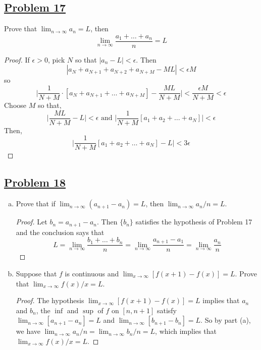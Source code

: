 \documentclass[10pt,letterpaper]{article}
\begin{document}
	\subsection*{{\color{purple}\underline{Problem 17}}}
	Prove that $\displaystyle\lim_{n\to \infty}a_n = L$, then
	$$\displaystyle\lim_{n\to \infty} \dfrac{a_1 + \ldots + a_n}{n} = L$$
	\begin{proof}
		If $\epsilon > 0$, pick $N$ so that $|a_n - L| < \epsilon$. Then 
		$$|a_N + a_{N+1} + a_{N + 2} + a_{N + M} - ML| < \epsilon M$$
		so 
		$$\bigg|\dfrac{1}{N + M} \cdot [a_N + a_{N+1} + \ldots + a_{N+M}]  - \dfrac{ML}{N + M}\bigg| < \dfrac{\epsilon M}{N + M} < \epsilon$$
		Choose $M$ so that,
		$$\bigg|\dfrac{ML}{N + M} - L\bigg| < \epsilon \text{ and } \bigg| \dfrac{1}{N + M}[a_1 + a_2 + \ldots + a_N]\bigg| < \epsilon$$
		Then,
		$$\bigg| \dfrac{1}{N + M}[a_1 + a_2 + \ldots + a_N] - L\bigg| < 3 \epsilon$$
	\end{proof}
	
	\subsection*{{\color{purple}\underline{Problem 18}}}
	\begin{enumerate}[(a)]
		\item Prove that if $\displaystyle\lim_{n\to \infty}(a_{n+1} - a_n) = L$, then $\displaystyle\lim_{n\to \infty}a_n/n = L$. 
		\begin{proof}
		Let $b_n = a_{n+1} - a_n$. Then $\{b_n\}$ satisfies the hypothesis of Problem 17 and the conclusion says that
		$$L = \displaystyle\lim_{n\to \infty} \dfrac{b_1 + \ldots + b_n}{n} = \displaystyle\lim_{n\to \infty}\dfrac{a_{n+1} - a_1}{n} = \displaystyle\lim_{n\to \infty}
		\dfrac{a_n}{n}$$
		
		\end{proof}
		\item Suppose that $f$ is continuous and $\displaystyle\lim_{x\to \infty} [f(x+1) - f(x)] = L$. Prove that
		$\displaystyle\lim_{x\to \infty}f(x)/x = L$.
		\begin{proof}
		The hypothesis $\displaystyle\lim_{x\to \infty}[f(x+1) - f(x)] = L$ implies that $a_n$ and $b_n$, the $\inf$ and
		$\sup$ of $f$ on $[n, n + 1]$ satisfy $\displaystyle\lim_{n\to \infty}[a_{n+1} - a_n] = L$ and 
		$\displaystyle\lim_{n\to \infty}[b_{n+1} - b_n] = L$. So by part (a), we have 
		$\displaystyle\lim_{n\to \infty}a_n/n = \displaystyle\lim_{n\to \infty}b_n/n = L$, which implies that
		$\displaystyle\lim_{x\to \infty}f(x)/x = L$.
		\end{proof}
	\end{enumerate}
	
\end{document}

